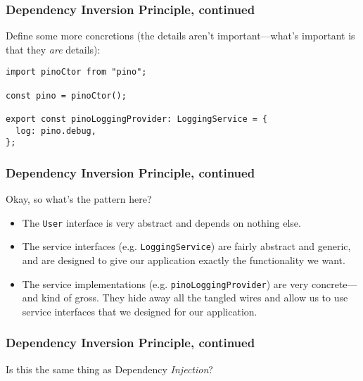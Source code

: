\documentclass[aspectratio=169]{beamer}
\begin{document}
\begin{frame}[fragile]
  \frametitle{Dependency Inversion Principle, continued}
  Define some more concretions (the details aren't important---what's important
  is that they \emph{are} details):

  \vspace{1em}

  \begin{verbatim}
import pinoCtor from "pino";

const pino = pinoCtor();

export const pinoLoggingProvider: LoggingService = {
  log: pino.debug,
};
  \end{verbatim}
\end{frame}

\begin{frame}
  \frametitle{Dependency Inversion Principle, continued}
  Okay, so what's the pattern here?

  \begin{itemize}
    \item The \texttt{User} interface is very abstract and depends on nothing
          else.
    \item The service interfaces (e.g. \texttt{LoggingService}) are fairly
          abstract and generic, and are designed to give our application exactly
          the functionality we want.
    \item The service implementations (e.g. \texttt{pinoLoggingProvider}) are
          very concrete---and kind of gross. They hide away all the tangled
          wires and allow us to use service interfaces that we designed for our
          application.
  \end{itemize}
\end{frame}

\begin{frame}
  \frametitle{Dependency Inversion Principle, continued}
  Is this the same thing as Dependency \textit{Injection}?
\end{frame}
\end{document}
